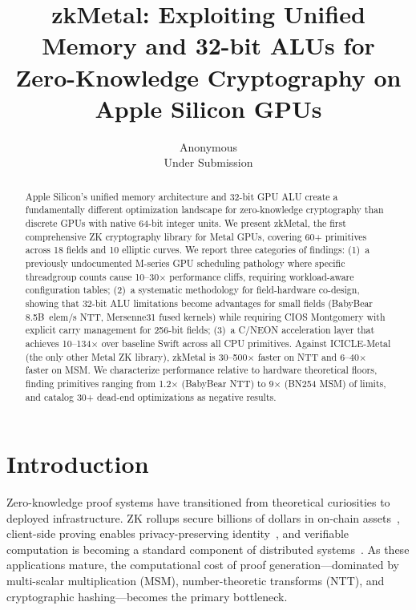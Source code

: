 \documentclass[letterpaper,twocolumn,10pt]{article}
\newcommand{\sys}{zkMetal\xspace}
\begin{document}
\title{\sys: Exploiting Unified Memory and 32-bit ALUs for\\Zero-Knowledge Cryptography on Apple Silicon GPUs}

\author{
{\rm Anonymous}\\
Under Submission
}

\maketitle

\begin{abstract}
Apple Silicon's unified memory architecture and 32-bit GPU ALU create a
fundamentally different optimization landscape for zero-knowledge
cryptography than discrete GPUs with native 64-bit integer units. We present
\sys, the first comprehensive ZK cryptography library for Metal GPUs,
covering 60+ primitives across 18 fields and 10 elliptic curves. We report
three categories of findings: (1)~a previously undocumented M-series GPU
scheduling pathology where specific threadgroup counts cause 10--30$\times$
performance cliffs, requiring workload-aware configuration tables; (2)~a
systematic methodology for field-hardware co-design, showing that 32-bit ALU
limitations become advantages for small fields (BabyBear 8.5B~elem/s NTT,
Mersenne31 fused kernels) while requiring CIOS Montgomery with explicit
carry management for 256-bit fields; (3)~a C/NEON acceleration layer that
achieves 10--134$\times$ over baseline Swift across all CPU primitives.
Against ICICLE-Metal (the only other Metal ZK library), \sys is
30--500$\times$ faster on NTT and 6--40$\times$ faster on MSM. We
characterize performance relative to hardware theoretical floors, finding
primitives ranging from 1.2$\times$ (BabyBear NTT) to 9$\times$ (BN254 MSM)
of limits, and catalog 30+ dead-end optimizations as negative results.
\end{abstract}

\section{Introduction}
\label{sec:intro}

Zero-knowledge proof systems have transitioned from theoretical curiosities
to deployed infrastructure. ZK rollups secure billions of dollars in
on-chain assets~\cite{zksync,starknet}, client-side proving enables
privacy-preserving identity~\cite{semaphore,anon-aadhaar}, and verifiable
computation is becoming a standard component of distributed
systems~\cite{risc0,sp1}. As these applications mature, the computational
cost of proof generation---dominated by multi-scalar multiplication (MSM),
number-theoretic transforms (NTT), and cryptographic hashing---becomes the
primary bottleneck.
\end{document}
